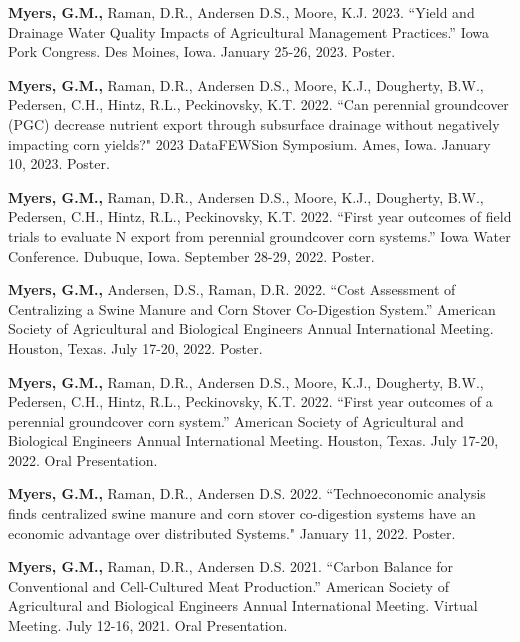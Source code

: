 

\begin{cvparagraph}

   
   \textbf{Myers, G.M., }Raman, D.R.,  Andersen D.S., Moore, K.J. 2023. “Yield and Drainage Water Quality Impacts of Agricultural Management Practices.” Iowa Pork Congress. Des Moines, Iowa. January 25-26, 2023. Poster.
   
   \textbf{Myers, G.M., }Raman, D.R.,  Andersen D.S., Moore, K.J., Dougherty, B.W., Pedersen, C.H., Hintz, R.L., Peckinovsky, K.T. 2022. “Can perennial groundcover (PGC) decrease nutrient export through subsurface drainage without negatively impacting corn yields?" 2023 DataFEWSion Symposium. Ames, Iowa. January 10, 2023. Poster. 
   
  \textbf{Myers, G.M., }Raman, D.R.,  Andersen D.S., Moore, K.J., Dougherty, B.W., Pedersen, C.H., Hintz, R.L., Peckinovsky, K.T. 2022. “First year outcomes of field trials to evaluate N export from perennial groundcover corn systems.” Iowa Water Conference. Dubuque, Iowa. September 28-29, 2022. Poster.

  \textbf{Myers, G.M., }Andersen, D.S., Raman, D.R. 2022. “Cost Assessment of Centralizing a Swine Manure and Corn Stover Co-Digestion System.” American Society of Agricultural and Biological Engineers Annual International Meeting. Houston, Texas. July 17-20, 2022. Poster.

  \textbf{Myers, G.M., }Raman, D.R.,  Andersen D.S., Moore, K.J., Dougherty, B.W., Pedersen, C.H., Hintz, R.L., Peckinovsky, K.T. 2022. “First year outcomes of a perennial groundcover corn system.” American Society of Agricultural and Biological Engineers Annual International Meeting. Houston, Texas. July 17-20, 2022. Oral Presentation.

  \textbf{Myers, G.M., }Raman, D.R.,  Andersen D.S. 2022. “Technoeconomic analysis finds centralized swine manure and corn stover co-digestion systems have an economic advantage over distributed Systems." January 11, 2022. Poster.

  \textbf{Myers, G.M., }Raman, D.R.,  Andersen D.S. 2021. “Carbon Balance for Conventional and Cell-Cultured Meat Production.” American Society of Agricultural and Biological Engineers Annual International Meeting. Virtual Meeting. July 12-16, 2021. Oral Presentation.


\end{cvparagraph}
